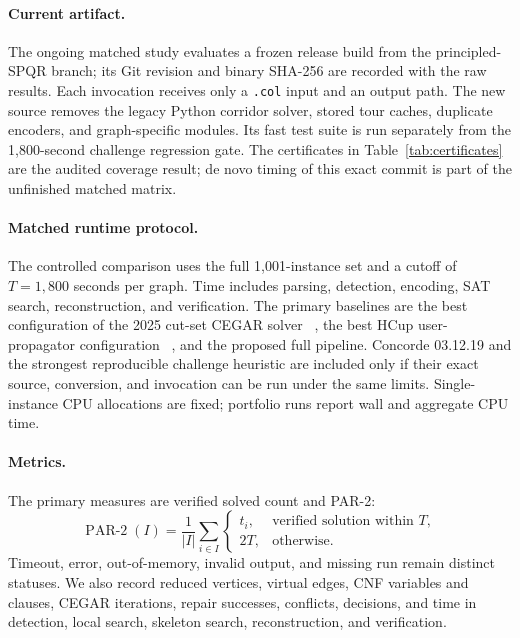 \documentclass[sigconf,anonymous]{aamas}
\begin{document}
\paragraph{Current artifact.}
The ongoing matched study evaluates a frozen release build from the
principled-SPQR branch; its Git revision and binary SHA-256 are recorded
with the raw results. Each invocation receives only a \texttt{.col} input
and an output path. The new source removes the legacy Python corridor
solver, stored tour caches, duplicate encoders, and graph-specific
modules. Its fast test suite is run separately from the 1,800-second
challenge regression gate. The certificates in Table~\ref{tab:certificates}
are the audited coverage result; de novo timing of this exact commit is
part of the unfinished matched matrix.

\paragraph{Matched runtime protocol.}
The controlled comparison uses the full 1,001-instance set and a cutoff
of $T=1{,}800$ seconds per graph. Time includes parsing, detection,
encoding, SAT search, reconstruction, and verification. The primary
baselines are the best configuration of the 2025 cut-set CEGAR solver
~\cite{ohashi2025cutset}, the best HCup user-propagator configuration
~\cite{funder2026hcup}, and the proposed full pipeline. Concorde 03.12.19
and the strongest reproducible challenge heuristic are included only if
their exact source, conversion, and invocation can be run under the same
limits. Single-instance CPU allocations are fixed; portfolio runs report
wall and aggregate CPU time.

\paragraph{Metrics.}
The primary measures are verified solved count and PAR-2:
\begin{equation}
  \operatorname{PAR\mbox{-}2}(I)=\frac{1}{|I|}
  \sum_{i\in I}
  \begin{cases}
    t_i, & \text{verified solution within }T,\\
    2T, & \text{otherwise}.
  \end{cases}
  \label{eq:par2}
\end{equation}
Timeout, error, out-of-memory, invalid output, and missing run remain
distinct statuses. We also record reduced vertices, virtual edges, CNF
variables and clauses, CEGAR iterations, repair successes, conflicts,
decisions, and time in detection, local search, skeleton search,
reconstruction, and verification.
\end{document}
